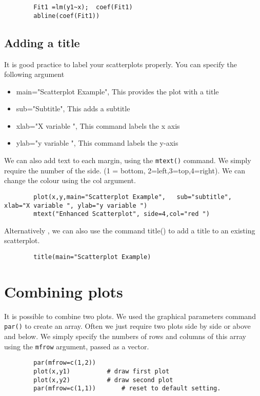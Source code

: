 \documentclass[a4paper,12pt]{article}
\begin{document}
\begin{itemize}
\begin{itemize}
		\large \begin{verbatim}
		Fit1 =lm(y1~x);  coef(Fit1)
		abline(coef(Fit1))	
		\end{verbatim}\large
		
		\subsection{Adding a title }
		
		It is good practice to label your scatterplots properly. You can specify the following argument
		\begin{itemize}
			\item	main="Scatterplot Example", 	This provides the plot with a title
			\item	sub="Subtitle",                 This adds a subtitle
			\item	xlab="X variable ",				This command labels the x axis 
			\item   ylab="y variable ",				This command labels the y-axis
		\end{itemize}
		We can also add text to each margin, using the \texttt{mtext()} command.  
		We simply require the number of the side. (1 = bottom, 2=left,3=top,4=right). 
		We can change the colour using the col argument.
		\large \begin{verbatim}
		plot(x,y,main="Scatterplot Example",   sub="subtitle",    xlab="X variable ", ylab="y variable ")	
		mtext("Enhanced Scatterplot", side=4,col="red ")
		\end{verbatim}\large
		Alternatively , we can also use the command title() to add a title to an existing scatterplot.
		\large \begin{verbatim}
		title(main="Scatterplot Example)	
		\end{verbatim}\large
		
		
		\section{Combining plots}
		It is possible to combine two plots. We used the graphical parameters command \texttt{par()} to create an array. 
		Often we just require two plots side by side or above and below. We simply specify the numbers of rows and columns of this array using the \texttt{mfrow} argument, passed as a vector.
		
		\begin{verbatim}
		par(mfrow=c(1,2))
		plot(x,y1)			# draw first plot
		plot(x,y2)			# draw second plot
		par(mfrow=c(1,1))		# reset to default setting.
		\end{verbatim}
		

\end{itemize}
\end{itemize}
\end{document}
